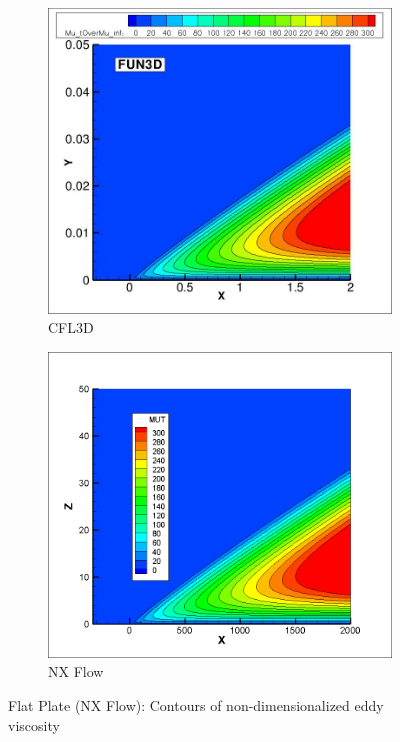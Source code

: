 \begin{figure}[ht!]
\centering
\begin{subfigure}{.45\textwidth}
  \centering
  \includegraphics[width=1.0\textwidth]{figs/flatnx/mut_contour_fun3d.jpg}
  \caption{CFL3D}
\end{subfigure}%
\begin{subfigure}{.45\textwidth}
  \centering
  \includegraphics[width=1.0\textwidth]{figs/flatnx/mut_contour.png}
  \caption{NX Flow}
\end{subfigure}
\caption{Flat Plate (NX Flow): Contours of non-dimensionalized eddy viscosity}
\label{fig:nxflatmutcontour}
\end{figure}

